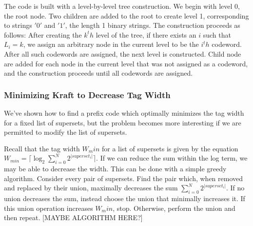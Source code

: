  The code is built with a level-by-level tree construction. We begin with level 0, the root node. Two children are added to the root to create level 1, corresponding to strings $'0'$ and $'1'$, the length 1 binary strings. The construction proceeds as follows:  After creating the $k^th$ level of the tree, if there exists an $i$ such that $L_i = k$, we assign an arbitrary node in the current level to be the $i^th$ codeword. After all such codewords are assigned, the next level is constructed. Child node are added for each node in the current level that was not assigned as a codeword, and the construction proceeds until all codewords are assigned.
 
\subsubsection{Minimizing Kraft to Decrease Tag Width}
We've shown how to find a prefix code which optimally minimizes the tag width for a fixed list of supersets, but the problem becomes more interesting if we are permitted to modify the list of supersets. 

Recall that the tag width $W_min$ for a list of supersets is given by the equation $W_{min} = \lceil\log_2{\sum_{i = 0}^{N}{2^{|superset_i|}}}\rceil$. If we can reduce the sum within the log term, we may be able to decrease the width. This can be done with a simple greedy algorithm. Consider every pair of supersets. Find the pair which, when removed and replaced by their union, maximally decreases the sum ${\sum_{i = 0}^{N}{2^{|superset_i|}}}$. If no union decreases the sum, instead choose the union that minimally increases it. If this union operation increases $W_min$, stop. Otherwise, perform the union and then repeat. [MAYBE ALGORITHM HERE?]

